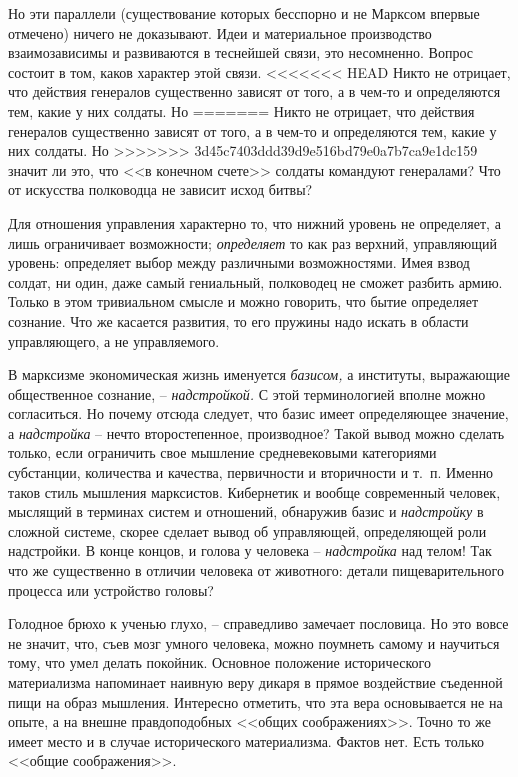\documentclass{book}
\begin{document}
Но эти параллели (существование которых бесспорно и не Марксом впервые отмечено) ничего не доказывают. Идеи и мате­риальное 
производство взаимозависимы и развиваются в тес­нейшей связи, это несомненно. Вопрос состоит в том, каков ха­рактер этой связи. 
<<<<<<< HEAD
Никто не отрицает, что действия генералов существенно зависят от того, а в чем‑то и определяются тем, ка­кие у них солдаты. Но 
=======
Никто не отрицает, что действия генералов существенно зависят от того, а в чем-то и определяются тем, ка­кие у них солдаты. Но 
>>>>>>> 3d45c7403ddd39d9e516bd79e0a7b7ca9e1dc159
значит ли это, что <<в конечном счете>> сол­даты командуют генералами? Что от искусства полководца не зависит исход битвы?

Для отношения управления характерно то, что нижний уро­вень не определяет, а лишь ограничивает возможности; \textit{определяет} 
то  как раз верхний, управляющий уровень: определяет выбор между различными возможностями. Имея взвод солдат, ни один, даже 
самый гениальный, полководец не сможет разбить армию. Только в этом тривиальном смысле и можно говорить, что бытие определяет 
сознание. Что же касается развития, то его пружины надо искать в области управляющего, а не управляемого.

В марксизме экономическая жизнь именуется \textit{базисом,} а институты, выражающие общественное сознание, -- 
\textit{надстройкой.} С этой терминологией вполне можно согласиться. Но почему отсюда следует, что базис имеет определяющее 
значение, а \textit{надстройка} -- нечто второстепенное, производное? Такой вывод можно сделать только, если ограничить свое 
мышление средневековыми категориями субстанции, количества и качества, первичности и вторичности и т.~п. Именно таков стиль 
мышления марксистов. Кибернетик и вообще современный человек, мыслящий в терминах систем и отношений, обнаружив базис  и 
\textit{надстройку}  в сложной системе, скорее сделает вывод об управляющей, определяющей роли надстройки.  В конце концов, и 
голова у человека -- \textit{надстройка}  над телом! Так что же существенно в отличии человека от животного: детали 
пищеварительного процесса или устройство головы?

Голодное брюхо к ученью глухо, -- справедливо замечает по­словица. Но это вовсе не значит, что, съев мозг умного человека, можно 
поумнеть самому и научиться тому, что умел делать по­койник. Основное положение исторического материализма на­поминает наивную 
веру дикаря в прямое воздействие съеденной пищи на образ мышления. Интересно отметить, что эта вера ос­новывается не на опыте, а 
на внешне правдоподобных <<общих соображениях>>. Точно то же имеет место и в случае историче­ского материализма. Фактов нет. Есть 
только <<общие сообра­жения>>.
\end{document}
